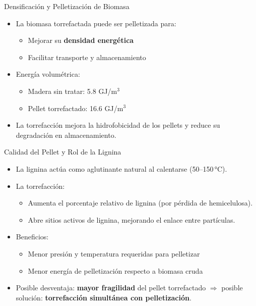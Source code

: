 \documentclass[main.tex]{subfiles}
\begin{document}
\begin{frame}{Densificación y Pelletización de Biomasa}
\small
\begin{itemize}
    \item La biomasa torrefactada puede ser pelletizada para:
    \begin{itemize}
        \item Mejorar su \textbf{densidad energética}
        \item Facilitar transporte y almacenamiento
    \end{itemize}
    \item Energía volumétrica:
    \begin{itemize}
        \item Madera sin tratar: 5.8 GJ/m$^3$
        \item Pellet torrefactado: 16.6 GJ/m$^3$
    \end{itemize}
    \item La torrefacción mejora la hidrofobicidad de los pellets y reduce su degradación en almacenamiento.
\end{itemize}
\end{frame}

\begin{frame}{Calidad del Pellet y Rol de la Lignina}
\small
\begin{itemize}
    \item La lignina actúa como aglutinante natural al calentarse (50–150 °C).
    \item La torrefacción:
    \begin{itemize}
        \item Aumenta el porcentaje relativo de lignina (por pérdida de hemicelulosa).
        \item Abre sitios activos de lignina, mejorando el enlace entre partículas.
    \end{itemize}
    \item Beneficios:
    \begin{itemize}
        \item Menor presión y temperatura requeridas para pelletizar
        \item Menor energía de pelletización respecto a biomasa cruda
    \end{itemize}
    \item Posible desventaja: \textbf{mayor fragilidad} del pellet torrefactado $\Rightarrow$ posible solución: \textbf{torrefacción simultánea con pelletización}.
\end{itemize}
\end{frame}
\end{document}
